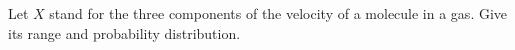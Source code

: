 

Let $X$ stand for the three components of the velocity of a molecule in a gas.
Give its range and probability distribution.

